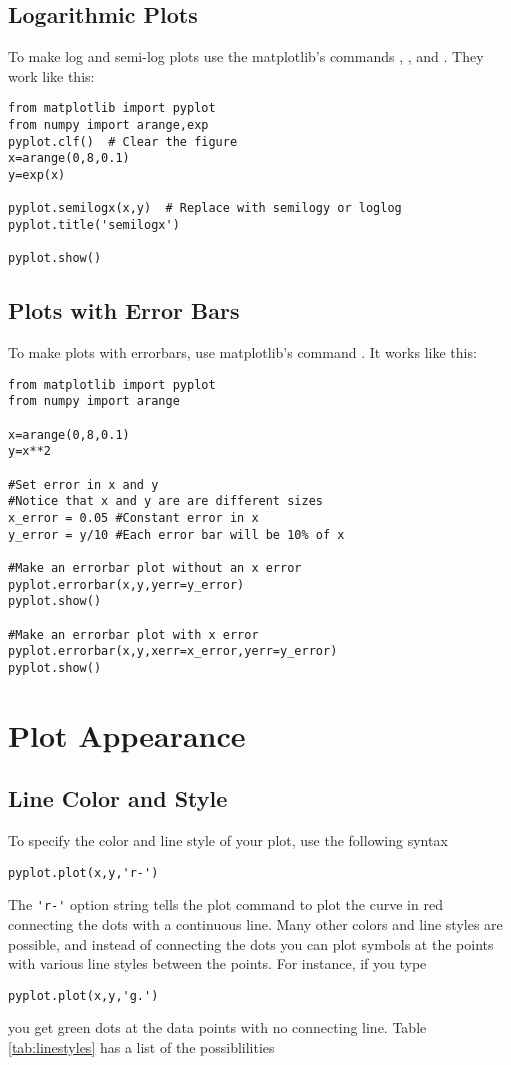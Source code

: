 \subsection*{Logarithmic Plots}
  To make log and
semi-log plots use the matplotlib's commands , , and
. They work like this:
\begin{Verbatim}
from matplotlib import pyplot
from numpy import arange,exp
pyplot.clf()  # Clear the figure
x=arange(0,8,0.1)
y=exp(x)

pyplot.semilogx(x,y)  # Replace with semilogy or loglog
pyplot.title('semilogx')

pyplot.show()
\end{Verbatim}

\subsection*{Plots with Error Bars}
To make plots with errorbars, use matplotlib's command . It works like this:
\begin{Verbatim}
from matplotlib import pyplot
from numpy import arange

x=arange(0,8,0.1)
y=x**2

#Set error in x and y
#Notice that x and y are are different sizes
x_error = 0.05 #Constant error in x
y_error = y/10 #Each error bar will be 10% of x

#Make an errorbar plot without an x error
pyplot.errorbar(x,y,yerr=y_error)
pyplot.show()

#Make an errorbar plot with x error
pyplot.errorbar(x,y,xerr=x_error,yerr=y_error)
pyplot.show()

\end{Verbatim}

\section{Plot Appearance}

\subsection*{Line Color and Style}

To specify the color and line style of your plot, use the following syntax
\begin{Verbatim}
pyplot.plot(x,y,'r-')
\end{Verbatim}
The \verb|'r-'| option string tells the plot command to plot the
curve in red connecting the dots with a continuous line. Many other
colors and line styles are possible, and instead of connecting the
dots you can plot symbols at the points with various line styles
between the points. For instance, if you type
\begin{Verbatim}
pyplot.plot(x,y,'g.')
\end{Verbatim}
you get green dots at the data points with no connecting line.  Table
\ref{tab:linestyles} has a list of the possiblilities

